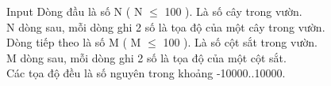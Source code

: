 Input
Dòng đầu là số N ( N  $\le$  100 ). Là số cây trong vườn.   
\\   N dòng sau, mỗi dòng ghi 2 số là tọa độ của một cây trong vườn.   
\\   Dòng tiếp theo là số M ( M  $\le$  100 ). Là số cột sắt trong vườn.   
\\   M dòng sau, mỗi dòng ghi 2 số là tọa độ của một cột sắt.   
\\   Các tọa độ đều là số nguyên trong khoảng -10000..10000.